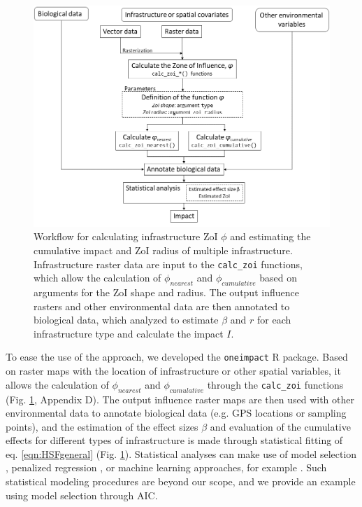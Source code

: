 \documentclass[titlepage]{article}
\begin{document}
\begin{figure}[h]
\centering
\includegraphics[width=1.3\textwidth,center]{figures/figure_workflow.png}
\caption{\label{fig:workflow} Workflow for calculating infrastructure ZoI $\phi$ and estimating the cumulative impact and ZoI radius of multiple infrastructure. Infrastructure raster data are input to the \texttt{calc\_zoi} functions, which allow the calculation 
of $\phi_{nearest}$ and $\phi_{cumulative}$ based on arguments for the ZoI shape and radius. The output influence rasters and other environmental data are then annotated to biological data, which analyzed to estimate $\beta$ and $r$ for each infrastructure type and calculate the impact $I$.}
\end{figure}

To ease the use of the approach, we developed the \verb|oneimpact| R package. Based on raster maps with the location of infrastructure or other spatial variables, it allows the calculation of $\phi_{nearest}$ and $\phi_{cumulative}$ through the \verb|calc_zoi| functions (Fig. \ref{fig:workflow}, Appendix D). The output influence raster maps are then used with other environmental data to annotate biological data (e.g. GPS locations or sampling points), and the estimation of the effect sizes $\beta$ and evaluation of the cumulative effects for different types of infrastructure is made through statistical fitting of eq. \ref{eqn:HSFgeneral} (Fig. \ref{fig:workflow}). Statistical analyses can make use of model selection \citep{burnham_model_2002}, penalized regression \citep{lee_estimating_2020}, or machine learning approaches, for example \citep[Appendix D]{james_introduction_2021}. Such statistical modeling procedures are beyond our scope, and we provide an example using model selection through AIC. 
\end{document}
